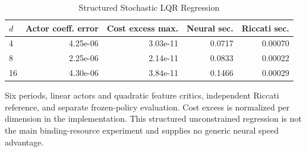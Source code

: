 \begin{table}[tbp]
\centering
\caption{Structured Stochastic LQR Regression}
\label{tab:lqr}
\small
\begin{tabular}{@{}lrrrr@{}}
\toprule
$d$ & Actor coeff. error & Cost excess max. & Neural sec. & Riccati sec. \\
\midrule
4 & 4.25e-06 & 3.03e-11 & 0.0717 & 0.00070 \\
8 & 2.25e-06 & 2.14e-11 & 0.0833 & 0.00022 \\
16 & 4.30e-06 & 3.84e-11 & 0.1466 & 0.00029 \\
\bottomrule
\end{tabular}
\par\smallskip\begin{minipage}{\linewidth}\footnotesize Six periods, linear actors and quadratic feature critics, independent Riccati reference, and separate frozen-policy evaluation. Cost excess is normalized per dimension in the implementation. This structured unconstrained regression is not the main binding-resource experiment and supplies no generic neural speed advantage.\end{minipage}
\end{table}
